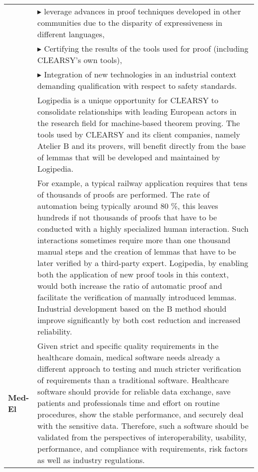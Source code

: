\begin{longtable}{|p{}|p{}|}
& $\blacktriangleright$ leverage advances in proof techniques
developed in other communities due to the disparity of expressiveness
in different languages,\\

& $\blacktriangleright$ Certifying the results of the tools used for
proof (including CLEARSY's own tools),\\


&
$\blacktriangleright$
  Integration of new technologies in an industrial context demanding qualification with respect to safety standards.
\\

&
\hspace{0.4cm}
Logipedia is a unique opportunity for CLEARSY to consolidate relationships with leading European actors in the research field for machine-based
theorem proving. The tools used by CLEARSY and its client companies, namely Atelier B and its provers, will benefit directly from the base of lemmas
that will be developed and maintained by Logipedia.\\

&
\hspace{0.4cm}
For example, a typical railway application requires that tens of thousands of proofs are performed. The rate of automation being typically around 80 \%,
this leaves hundreds if not thousands of proofs that have to be conducted with a highly specialized human interaction. Such interactions sometimes require
more than one thousand manual steps and the creation of lemmas that have to be later verified by a third-party expert.
Logipedia, by enabling both the application of new proof tools in this context, would both increase the ratio of automatic proof and facilitate the verification
of manually introduced lemmas. Industrial development based on the B method should improve significantly by both cost reduction
and increased reliability.
\\

\hline


{\bf Med-El}
&

Given strict and specific quality requirements in the healthcare
domain, medical software needs already a different approach to testing
and much stricter verification of requirements than a traditional
software. Healthcare software should provide for reliable data
exchange, save patients and professionals time and effort on routine
procedures, show the stable performance, and securely deal with the
sensitive data. Therefore, such a software should be validated from
the perspectives of interoperability, usability, performance, and
compliance with requirements, risk factors as well as industry
regulations.\\


\end{longtable}
